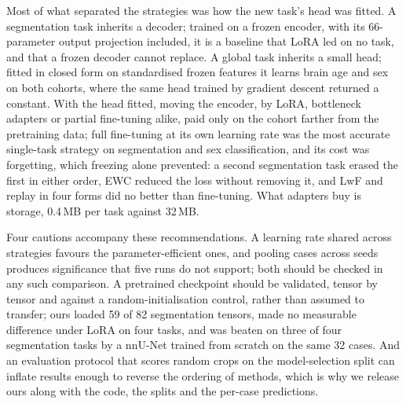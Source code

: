 \iffull\documentclass[journal]{IEEEtran}\else\documentclass[journal,twoside,web]{ieeecolor}\usepackage{generic}\fi
\begin{document}
Most of what separated the strategies was how the new task's head was fitted. A segmentation task inherits a decoder; trained on a frozen encoder, with its 66-parameter output projection included, it is a baseline that LoRA led on no task, and that a frozen decoder cannot replace. A global task inherits a small head; fitted in closed form on standardised frozen features it learns brain age and sex on both cohorts, where the same head trained by gradient descent returned a constant. With the head fitted, moving the encoder, by LoRA, bottleneck adapters or partial fine-tuning alike, paid only on the cohort farther from the pretraining data; full fine-tuning at its own learning rate was the most accurate single-task strategy on segmentation and sex classification, and its cost was forgetting, which freezing alone prevented: a second segmentation task erased the first in either order, EWC reduced the loss without removing it, and LwF and replay in four forms did no better than fine-tuning. What adapters buy is storage, 0.4\,MB per task against 32\,MB.

Four cautions accompany these recommendations. A learning rate shared across strategies favours the parameter-efficient ones, and pooling cases across seeds produces significance that five runs do not support; both should be checked in any such comparison. A pretrained checkpoint should be validated, tensor by tensor and against a random-initialisation control, rather than assumed to transfer; ours loaded 59 of 82 segmentation tensors, made no measurable difference under LoRA on four tasks, and was beaten on three of four segmentation tasks by a nnU-Net trained from scratch on the same 32 cases. And an evaluation protocol that scores random crops on the model-selection split can inflate results enough to reverse the ordering of methods, which is why we release ours along with the code, the splits and the per-case predictions.
\end{document}
